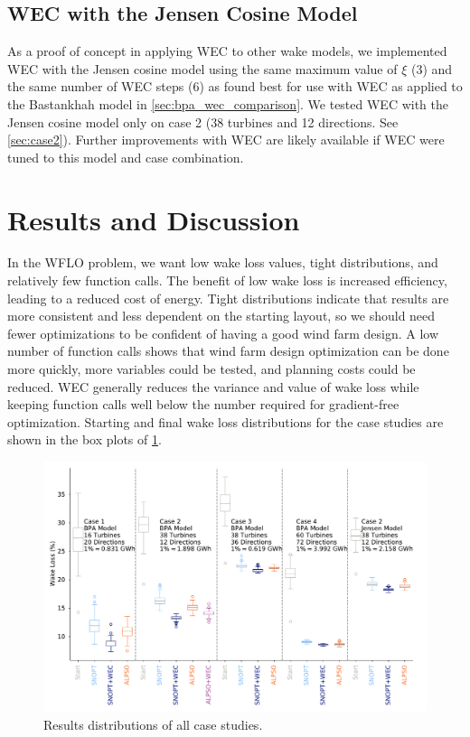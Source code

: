 \documentclass{jpconf}
\begin{document}
\subsection{WEC with the Jensen Cosine Model}
As a proof of concept in applying WEC to other wake models, we implemented WEC with the Jensen cosine model using the same maximum value of $\xi$ (3) and the same number of WEC steps (6) as found best for use with WEC as applied to the Bastankhah model in \cref{sec:bpa_wec_comparison}. We tested WEC with the Jensen cosine model only on case 2 (38 turbines and 12 directions. See \cref{sec:case2}). Further improvements with WEC are likely available if WEC were tuned to this model and case combination.

\section{Results and Discussion}\label{sec:results}

In the WFLO problem, we  want low wake loss values, tight distributions, and relatively few function calls. The benefit of low wake loss is increased efficiency, leading to a reduced cost of energy. Tight distributions indicate that results are more consistent and less dependent on the starting layout, so we should need fewer optimizations to be confident of having a good wind farm design. A low number of function calls shows that wind farm design optimization can be done more quickly, more variables could be tested, and planning costs could be reduced. WEC generally reduces the variance and value of wake loss while keeping function calls well below the number required for gradient-free optimization. Starting and final wake loss distributions for the case studies are shown in the box plots of \cref{fig:boxplots}. 
%
\begin{figure}[h!]
	\centering
	\begin{minipage}[t]{\textwidth}
		\centering
		\includegraphics[width=\textwidth]{final_images/results/dist_boxpercentwakeloss.pdf}  
		\caption{Results distributions of all case studies.}
		\label{fig:boxplots}
	\end{minipage} 
\end{figure}
\end{document}
